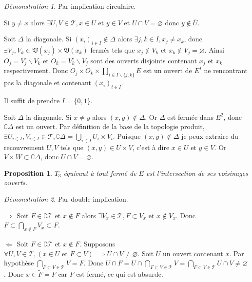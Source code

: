 \documentclass[a4paper, 11pt, french]{book}
\newenvironment{itemise}{\itemize}{\enditemize}
\theoremstyle{plain} %
\newtheorem{proposition}{Proposition}
\theoremstyle{definition} %
\theoremstyle{remark} %
\newtheorem*{demonstration}{Démonstration}
\renewcommand{\setminus}{\backslash}
\newcommand{\1}{\mathds{1}}
\newcommand\vide{\varnothing}
\newcommand\et{\text{ et }}
\begin{document}
\begin{demonstration}
	Par implication circulaire.
	\begin{itemise}
		\item Si $y\neq x$ alors $\exists U, V\in\mathscr{T}, x\in U\et y\in V\et U\cap V=\vide$ donc $y\notin\overline{U}$.
		\item Soit $\Delta$ la diagonale.
		Si $(x_i)_{i\in I}\notin\Delta$ alors $\exists j, k\in I, x_j\neq x_k$, donc $\exists V_j, V_k\in\mathfrak{V}(x_j)\times\mathfrak{V}(x_k)$ fermés tels que $x_j\notin V_k\et x_k\notin V_j=\vide$.
		Ainsi $O_j=V_j^\circ\setminus V_k$ et $O_k=V_k^\circ\setminus V_j$ sont des ouverts disjoints contenant $x_j$ et $x_k$ respectivement.
		Donc $O_j\times O_k\times\prod_{i\in I\setminus\{j, k\}}E$ est un ouvert de $E^I$ ne rencontrant pas la diagonale et contenant $(x_i)_{i\in I}$.
		\item Il suffit de prendre $I=\{0, 1\}$.
		\item Soit $\Delta$ la diagonale.
		Si $x\neq y$ alors $(x, y)\notin\Delta$.
		Or $\Delta$ est fermée dans $E^2$, donc $\complement\Delta$ est un ouvert.
		Par définition de la base de la topologie produit, $\exists U_{i\in I}, V_{i\in I}\in\mathscr{T}, \complement\Delta=\bigcup_{i\in I} U_i\times V_i$.
		Puisque $(x, y)\notin\Delta$ je peux extraire du recouvrement $U, V$ tels que $(x, y)\in U\times V$, c'est à dire $x\in U\et y\in V$.
		Or $V\times W\subset\complement\Delta$, donc $U\cap V=\vide$.
	\end{itemise}
\end{demonstration}

\begin{proposition}
	$T_3$ équivaut à tout fermé de $E$ est l'intersection de ses voisinages ouverts.
\end{proposition}

\begin{demonstration}
	Par double implication.
	\begin{itemise}
		\item[$\Rightarrow$] Soit $F\in\complement\mathscr{T}$ et $x\notin F$ alors $\exists V_x\in\mathscr{T}, F\subset V_x\et x\notin V_x$.
		Donc $F\subset\bigcap_{x\notin F}V_x\subset F$.
		\item[$\Leftarrow$] Soit $F\in\complement\mathscr{T}$ et $x\notin F$.
		Supposons $\forall U, V\in\mathscr{T}, (x\in U\et F\subset V)\implies U\cap V\neq\vide$.
		Soit $U$ un ouvert contenant $x$.
		Par hypothèse $\bigcap_{F\subset V\in\mathscr{T}}V=F$.
		Donc $U\cap F=U\cap\bigcap_{F\subset V\in\mathscr{T}}V=\bigcap_{F\subset V\in\mathscr{T}}U\cap V\neq\vide$.
		Donc $x\in\widetilde{F}=F$ car $F$ est fermé, ce qui est absurde.
	\end{itemise}
\end{demonstration}
\end{document}
